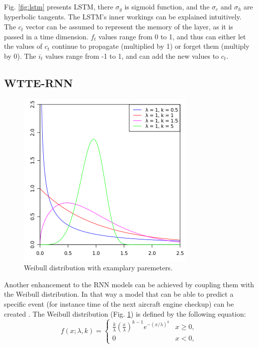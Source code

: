 
Fig. \ref{fig:lstm} presents LSTM, there $\sigma_g$ is sigmoid function, and the $\sigma_{c}$ and $\sigma_{h}$ are hyperbolic tangents.
The LSTM's inner workings can be explained intuitively. The $c_{t}$ vector can be assumed to represent the memory of the layer, as it is passed in  a time dimension. $f_{t}$ values range from 0 to 1, and thus can either let the values of $c_{t}$ continue to propagate (multiplied by 1) or forget them (multiply by 0). The $i_{t}$ values range from -1 to 1, and can add the new values to $c_{t}$.

\subsection{WTTE-RNN}
\label{sec:wtte_rnn}

\begin{figure}
  \centering
  \includegraphics[width=0.5\linewidth]{figures/chapter3/325px-Weibull_PDF.svg.png}

  \caption[wei2]{Weibull distribution with examplary paremeters\footnotemark.
  }
 \label{fig:weibull}

\end{figure}

Another enhancement to the RNN models can be achieved by coupling them with the Weibull distribution. In that way a model that can be able to predict a specific event (for instance time of the next aircraft engine checkup) can be created .
The Weibull distribution (Fig. \ref{fig:weibull}) is defined by the following equation:
\begin{equation}
f(x;\lambda,k) =
\begin{cases}
\frac{k}{\lambda}\left(\frac{x}{\lambda}\right)^{k-1}e^{-(x/\lambda)^{k}} & x\geq0 ,\\
0 & x<0,
\end{cases}
\end{equation}


